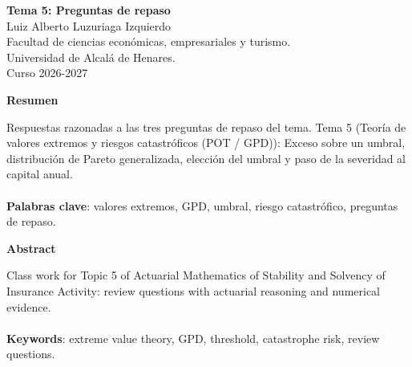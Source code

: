 \documentclass[a4paper,12pt]{article}
\begin{document}
\begin{titlepage}
    \centering
    \vspace*{0.1cm}
    \huge\textbf{Tema 5: Preguntas de repaso}\\
    \vspace{1cm}
    \small{Luiz Alberto Luzuriaga Izquierdo}\\
    \vspace{0.1cm}
    Facultad de ciencias económicas, empresariales y turismo. \\
    \vspace{0.1cm}
    Universidad de Alcalá de Henares. \\
    \vspace{0.1cm}
    Curso 2026-2027\\
    \vspace{0.5cm}

{\bfseries Resumen}

\vspace{0.1cm}
\noindent
\begin{justify}
Respuestas razonadas a las tres preguntas de repaso del tema. Tema 5 (Teoría de valores extremos y riesgos catastróficos (POT / GPD)): Exceso sobre un umbral, distribución de Pareto generalizada, elección del umbral y paso de la severidad al capital anual.\\\\
\vspace{0.1cm}
\noindent
\textbf{Palabras clave}: valores extremos, GPD, umbral, riesgo catastrófico, preguntas de repaso.
\end{justify}
\begin{center}
    {\bfseries Abstract}
\end{center}
\vspace{0.1cm}
\noindent
\begin{justify}
Class work for Topic 5 of Actuarial Mathematics of Stability and Solvency of Insurance Activity: review questions with actuarial reasoning and numerical evidence.\\\\
\vspace{0.1cm}
\noindent
\textbf{Keywords}: extreme value theory, GPD, threshold, catastrophe risk, review questions.
\end{justify}

\end{titlepage}

\newpage{}
\renewcommand{\contentsname}{Índice}
\tableofcontents
\end{document}
